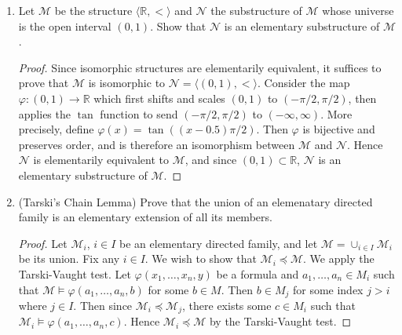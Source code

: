 \documentclass{article}
\begin{document}
\begin{enumerate}
\begin{enumerate}
\begin{proof}
          For each $n\in\mathbb{N}\setminus\{0,1\}$, $S_n$ is unique,
          hence we have infinitely many minimal definable and infinite
          subsets $S_n$.
        \end{proof}
    \end{enumerate}

  \item Let $\mathcal{M}$ be the structure
    $\langle\mathbb{R},<\rangle$ and $\mathcal{N}$ the substructure of
    $\mathcal{M}$ whose universe is the open interval $(0,1)$. Show
    that $\mathcal{N}$ is an elementary substructure of $\mathcal{M}$.

    \begin{proof}
      Since isomorphic structures are elementarily equivalent, it
      suffices to prove that $\mathcal{M}$ is isomorphic to
      $\mathcal{N}=\langle(0,1),<\rangle$. Consider the map
      $\varphi:(0,1)\rightarrow\mathbb{R}$ which first
      shifts and scales $(0,1)$ to $(-\pi/2,\pi/2)$, then applies the
      $\tan$ function to send $(-\pi/2,\pi/2)$ to $(-\infty,\infty)$.
      More precisely, define $\varphi(x)=\tan((x-0.5)\pi/2)$. Then
      $\varphi$ is bijective and preserves order, and is therefore an
      isomorphism between $\mathcal{M}$ and $\mathcal{N}$. Hence
      $\mathcal{N}$ is elementarily equivalent to $\mathcal{M}$, and
      since $(0,1)\subset\mathbb{R}$, $\mathcal{N}$ is an elementary
      substructure of $\mathcal{M}$.
    \end{proof}

  \item (Tarski's Chain Lemma) Prove that the union of an elemenatary
    directed family is an elementary extension of all its members.
    \begin{proof}
      Let $\mathcal{M}_i$, $i\in I$ be an elementary directed family, and
      let $\mathcal{M}=\cup_{i\in I}\mathcal{M}_i$ be its union. Fix any
      $i\in I$. We wish to show that $\mathcal{M}_i\preceq\mathcal{M}$. We
      apply the Tarski-Vaught test. Let $\varphi(x_1,\ldots,x_n,y)$ be a
      formula and $a_1,\ldots,a_n\in M_i$ such that
      $\mathcal{M}\models\varphi(a_1,\ldots,a_n,b)$ for some $b\in M$. Then
      $b\in M_j$ for some index $j>i$ where $j\in I$. Then since
      $\mathcal{M}_i\preceq\mathcal{M}_j$, there exists some $c\in M_i$
      such that $\mathcal{M}_i\models\varphi(a_1,\ldots,a_n,c)$. Hence
      $\mathcal{M}_i\preceq\mathcal{M}$ by the Tarski-Vaught test.
    \end{proof}


\end{enumerate}
\end{document}
